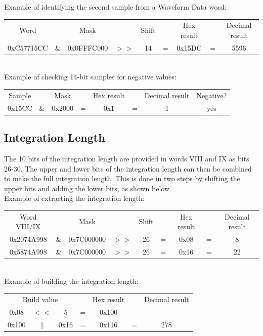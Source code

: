 \documentclass[letterpaper,12pt,notitlepage]{report}
\begin{document}
 Example of identifying the second sample from a Waveform Data word:\\

\begin{tabular}{ccccccccc}
Word &  & Mask & & Shift & & Hex result & & Decimal result\\
0xC57715CC & \& & 0x0FFFC000 & $>>$ & 14 & = & 0x15DC & = & 5596\\
\end{tabular}\\

Example of checking 14-bit samples for negative values:

\begin{tabular}{cccccccc}
Sample & & Mask & & Hex result & & Decimal result & Negative?\\
0x15CC & \& & 0x2000 & = & 0x1 & = & 1 & yes\\
\end{tabular}


\subsection{Integration Length}
The 10 bits of the integration length are provided in words VIII and IX as bits 26-30. The upper and lower bits of the integration length can then be combined to make the full integration length. This is done in two steps by shifting the upper bits and adding the lower bits, as shown below.\\

Example of extracting the integration length:\\

\begin{tabular}{ccccccccc}
Word VIII/IX &  & Mask & & Shift & & Hex result & & Decimal result\\
0x2074A998 & \& & 0x7C000000 & $>>$ & 26 & = & 0x08 & = & 8\\
0x5874A998 & \& & 0x7C000000 & $>>$ & 26 & = & 0x16 & = & 22\\
\end{tabular}\\

Example of building the integration length:\\

\begin{tabular}{ccccccc}
\multicolumn{3}{c}{Build value} & & Hex result & & Decimal result\\
0x08 & $<<$ & 5 & = & 0x100\\
0x100 & $||$ & 0x16 & = & 0x116 & = & 278\\
\end{tabular}
\end{document}
